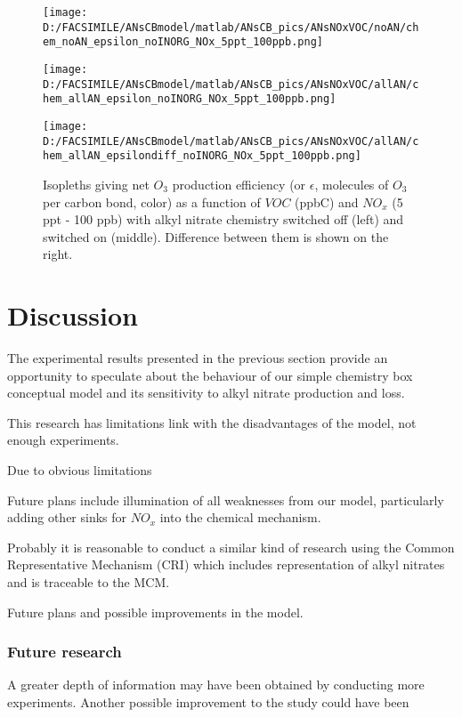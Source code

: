 \documentclass[11pt,a4paper]{article}
\begin{document}
\begin{figure} %
\centering
\begin{minipage}{.3\textwidth}
  \centering
  \texttt{[image: D:/FACSIMILE/ANsCBmodel/matlab/ANsCB\_pics/ANsNOxVOC/noAN/chem\_noAN\_epsilon\_noINORG\_NOx\_5ppt\_100ppb.png]}
\end{minipage}
\begin{minipage}{.3\textwidth}
  \centering
  \texttt{[image: D:/FACSIMILE/ANsCBmodel/matlab/ANsCB\_pics/ANsNOxVOC/allAN/chem\_allAN\_epsilon\_noINORG\_NOx\_5ppt\_100ppb.png]}
\end{minipage}
\begin{minipage}{.3\textwidth}
  \centering
  \texttt{[image: D:/FACSIMILE/ANsCBmodel/matlab/ANsCB\_pics/ANsNOxVOC/allAN/chem\_allAN\_epsilondiff\_noINORG\_NOx\_5ppt\_100ppb.png]}
\end{minipage}
\caption{Isopleths giving net $O_3$ production efficiency (or $\epsilon$, molecules of $O_3$ per carbon bond, color) as a function of $VOC$ (ppbC) and $NO_x$ (5 ppt - 100 ppb) with alkyl nitrate chemistry switched off (left) and switched on (middle). Difference between them is shown on the right.}\label{fig:epsilon5ppt100ppb}
\end{figure}
\section{Discussion} \label{sec:discuss}
The experimental results presented in the previous section provide an opportunity to speculate about the behaviour of our simple chemistry box conceptual model and its sensitivity to alkyl nitrate production and loss. 

This research has limitations link with the disadvantages of the model, not enough experiments.

Due to obvious limitations 

Future plans include illumination of all weaknesses from our model, particularly adding other sinks for $NO_x$ into the chemical mechanism.

Probably it is reasonable to conduct a similar kind of research using the Common Representative Mechanism (CRI) which includes representation of alkyl nitrates and is traceable to the MCM.

Future plans and possible improvements in the model.

\subsubsection*{Future research}
A greater depth of information may have been obtained by conducting more experiments.
Another possible improvement to the study could have been
\end{document}
